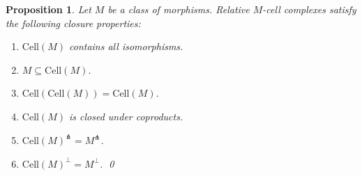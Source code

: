 \documentclass[a4paper]{article}
\newtheorem{proposition}[theorem]{Proposition}
\theoremstyle{remark}
\theoremstyle{definition}
\begin{document}
\begin{proposition}
  Let $M$ be a class of morphisms.
  Relative $M$-cell complexes satisfy the following closure properties:
  \begin{enumerate}
    \item
      $\mathrm{Cell}(M)$ contains all isomorphisms.
    \item
      $M \subseteq \mathrm{Cell}(M)$.
    \item
      \label{itm:cell-idempotent}
      $\mathrm{Cell}(\mathrm{Cell}(M)) = \mathrm{Cell}(M)$.
    \item
      \label{itm:cell-coproducts}
      $\mathrm{Cell}(M)$ is closed under coproducts.
    \item
      \label{itm:cell-injective}
      $\mathrm{Cell}(M)^\pitchfork = M^\pitchfork$.
    \item
      $\mathrm{Cell}(M)^\perp = M^\perp$.
      \qed
  \end{enumerate}
\end{proposition}
\end{document}
